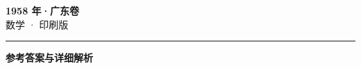 \documentclass[zihao=5, a4paper]{ctexart}
\begin{document}
\begin{center}
  {\Large\bfseries 1958 年·广东卷}\\[4pt]
  {\large 数学 · 印刷版}
\end{center}
\medskip
{}

\par\bigskip\hrule\bigskip
{}
\begin{center}{\large\bfseries 参考答案与详细解析}\end{center}
\smallskip

\end{document}
